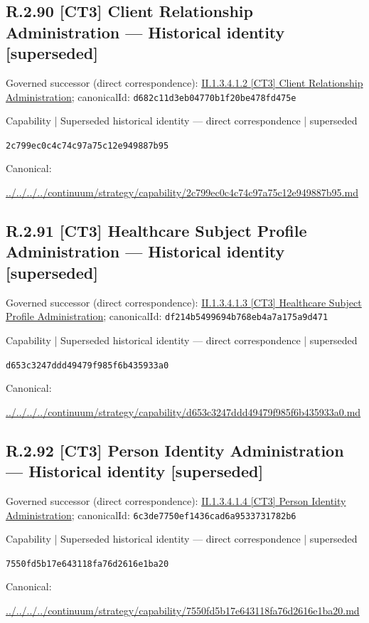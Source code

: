 \documentclass[10pt,a4paper]{article}
\begin{document}
\subsection*{R.2.90 [CT3] Client Relationship Administration — Historical identity [superseded]}
Governed successor (direct correspondence): \hyperref[element-d682c11d3eb04770b1f20be478fd475e]{II.1.3.4.1.2 [CT3] Client Relationship Administration}; canonicalId: \texttt{d682c11d3eb04770b1f20be478fd475e}\par
\label{element-2c799ec0c4c74c97a75c12e949887b95}
{\small Capability | Superseded historical identity — direct correspondence | superseded}\par
\texttt{2c799ec0c4c74c97a75c12e949887b95}\par
Canonical: \par
{\footnotesize\url{../../../../continuum/strategy/capability/2c799ec0c4c74c97a75c12e949887b95.md}}\par
\subsection*{R.2.91 [CT3] Healthcare Subject Profile Administration — Historical identity [superseded]}
Governed successor (direct correspondence): \hyperref[element-df214b5499694b768eb4a7a175a9d471]{II.1.3.4.1.3 [CT3] Healthcare Subject Profile Administration}; canonicalId: \texttt{df214b5499694b768eb4a7a175a9d471}\par
\label{element-d653c3247ddd49479f985f6b435933a0}
{\small Capability | Superseded historical identity — direct correspondence | superseded}\par
\texttt{d653c3247ddd49479f985f6b435933a0}\par
Canonical: \par
{\footnotesize\url{../../../../continuum/strategy/capability/d653c3247ddd49479f985f6b435933a0.md}}\par
\subsection*{R.2.92 [CT3] Person Identity Administration — Historical identity [superseded]}
Governed successor (direct correspondence): \hyperref[element-6c3de7750ef1436cad6a9533731782b6]{II.1.3.4.1.4 [CT3] Person Identity Administration}; canonicalId: \texttt{6c3de7750ef1436cad6a9533731782b6}\par
\label{element-7550fd5b17e643118fa76d2616e1ba20}
{\small Capability | Superseded historical identity — direct correspondence | superseded}\par
\texttt{7550fd5b17e643118fa76d2616e1ba20}\par
Canonical: \par
{\footnotesize\url{../../../../continuum/strategy/capability/7550fd5b17e643118fa76d2616e1ba20.md}}\par
\end{document}
